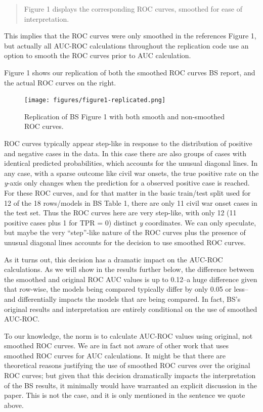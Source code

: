 \documentclass[]{article}
\begin{document}
\begin{quote}
Figure 1 displays the corresponding ROC curves, smoothed for ease of
interpretation.
\end{quote}

This implies that the ROC curves were only smoothed in the references
Figure 1, but actually all AUC-ROC calculations throughout the
replication code use an option to smooth the ROC curves prior to AUC
calculation.

Figure 1 shows our replication of both the smoothed ROC curves BS
report, and the actual ROC curves on the right.

\begin{figure}
\centering
\texttt{[image: figures/figure1-replicated.png]}
\caption{Replication of BS Figure 1 with both smooth and non-smoothed
ROC curves.}
\end{figure}

ROC curves typically appear step-like in response to the distribution of
positive and negative cases in the data. In this case there are also
groups of cases with identical predicted probabilities, which accounts
for the unusual diagonal lines. In any case, with a sparse outcome like
civil war onsets, the true positive rate on the \emph{y}-axis only
changes when the prediction for a observed positive case is reached. For
these ROC curves, and for that matter in the basic train/test split used
for 12 of the 18 rows/models in BS Table 1, there are only 11 civil war
onset cases in the test set. Thus the ROC curves here are very
step-like, with only 12 (11 positive cases plus 1 for TPR = 0) distinct
\emph{y} coordinates. We can only speculate, but maybe the very
``step''-like nature of the ROC curves plus the presence of unusual
diagonal lines accounts for the decision to use smoothed ROC curves.

As it turns out, this decision has a dramatic impact on the AUC-ROC
calculations. As we will show in the results further below, the
difference between the smoothed and original ROC AUC values is up to
0.12--a huge difference given that row-wise, the models being compared
typically differ by only 0.05 or less--and differentially impacts the
models that are being compared. In fact, BS's original results and
interpretation are entirely conditional on the use of smoothed AUC-ROC.

To our knowledge, the norm is to calculate AUC-ROC values using
original, not smoothed ROC curves. We are in fact not aware of other
work that uses smoothed ROC curves for AUC calculations. It might be
that there are theoretical reasons justifying the use of smoothed ROC
curves over the original ROC curves; but given that this decision
dramatically impacts the interpretation of the BS results, it minimally
would have warranted an explicit discussion in the paper. This is not
the case, and it is only mentioned in the sentence we quote above.
\end{document}
